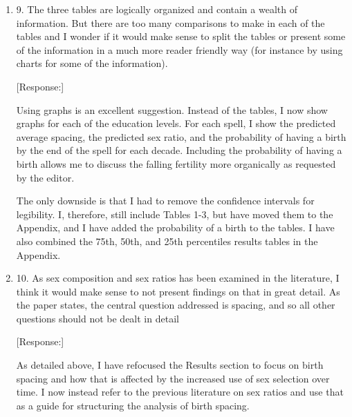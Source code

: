 \documentclass[letterpaper,12pt]{article}
\begin{document}
\begin{enumerate}
[Response:]

I agree completely that the regional differences in fertility, son preference, and use 
of sex selection are important.
To try to capture these differences, I have divided India into four broad regions 
depending on degree of son preference and initial fertility level as in 
\citet{retherford03b}, although expanded to include all states in the surveys.
In addition to the power problem, some education/region/spell/period combinations have too 
small sample sizes for the estimations to converge.
The lack of convergence is especially an issue for the lower and middle-education groups.
I, therefore, first present the all-India results and then focus on regional differences
for only the most educated women, who are the main users of sex selection.


\item 9. The three tables are logically organized and contain a wealth of
information. But there are too many comparisons to make in each of the
tables and I wonder if it would make sense to split the tables or
present some of the information in a much more reader friendly way (for
instance by using charts for some of the information). 

[Response:]

Using graphs is an excellent suggestion.
Instead of the tables, I now show graphs for each of the education levels.
For each spell, I show the predicted average spacing, the predicted sex ratio, and the 
probability of having a birth by the end of the spell for each decade.
Including the probability of having a birth allows me to discuss the falling fertility 
more organically as requested by the editor.

The only downside is that I had to remove the confidence intervals for legibility. 
I, therefore, still include Tables 1-3, but have moved them to the Appendix, and I have 
added the probability of a birth to the tables.
I have also combined the 75th, 50th, and 25th percentiles results tables in the Appendix.

\item 10. As sex composition and sex ratios has been examined in the literature, I think
it would make sense to not present findings on that in great detail. As
the paper states, the central question addressed is spacing, and so all
other questions should not be dealt in detail

[Response:]

As detailed above, I have refocused the Results section to focus on birth spacing and how 
that is affected by the increased use of sex selection over time.
I now instead refer to the previous literature on sex ratios and use that as a guide for
structuring the analysis of birth spacing.



\end{enumerate}
\end{document}

